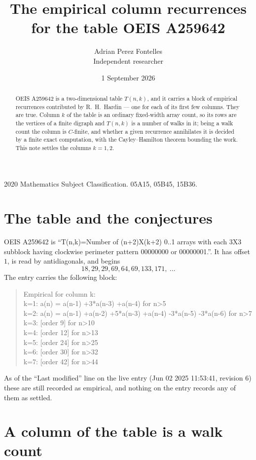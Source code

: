 \documentclass[11pt,a4paper]{article}
\title{The empirical column recurrences for the table OEIS A259642}
\author{Adrian Perez Fontelles\\ \small Independent researcher}
\date{1 September 2026}
\theoremstyle{plain}
\theoremstyle{definition}
\begin{document}
\maketitle

\begin{abstract}
OEIS A259642 is a two-dimensional table $T(n,k)$, and it carries a block of empirical
recurrences contributed by R.~H.~Hardin --- one for each of its first few columns. They are
true. Column $k$ of the table is an ordinary fixed-width array count, so its rows are the
vertices of a finite digraph and $T(n,k)$ is a number of walks in it; being a walk count the
column is $C$-finite, and whether a given recurrence annihilates it is decided by a finite
exact computation, with the Cayley--Hamilton theorem bounding the work. This note settles the columns $k=1, 2$.
\end{abstract}

\noindent\small 2020 Mathematics Subject Classification. 05A15, 05B45, 15B36.\normalsize

\section{The table and the conjectures}

OEIS A259642 is ``T(n,k)=Number of (n+2)X(k+2) 0..1 arrays with each 3X3 subblock having clockwise perimeter pattern 00000000 or 00000001.''. It has offset $1$, is
read by antidiagonals, and begins
\[
18, 29, 29, 69, 64, 69, 133, 171,\ \dots
\]
The entry carries the following block:
\begin{quote}\small
Empirical for column k:\\
k=1: a(n) = a(n-1) +3*a(n-3) +a(n-4) for n>5\\
k=2: a(n) = a(n-1) +a(n-2) +5*a(n-3) +a(n-4) -3*a(n-5) -3*a(n-6) for n>7\\
k=3: [order 9] for n>10\\
k=4: [order 12] for n>13\\
k=5: [order 24] for n>25\\
k=6: [order 30] for n>32\\
k=7: [order 42] for n>44\\
\end{quote}
As of the ``Last modified'' line on the live entry (Jun 02 2025 11:53:41, revision 6) these are still
recorded as empirical, and nothing on the entry records any of them as settled.

\section{A column of the table is a walk count}
\end{document}
